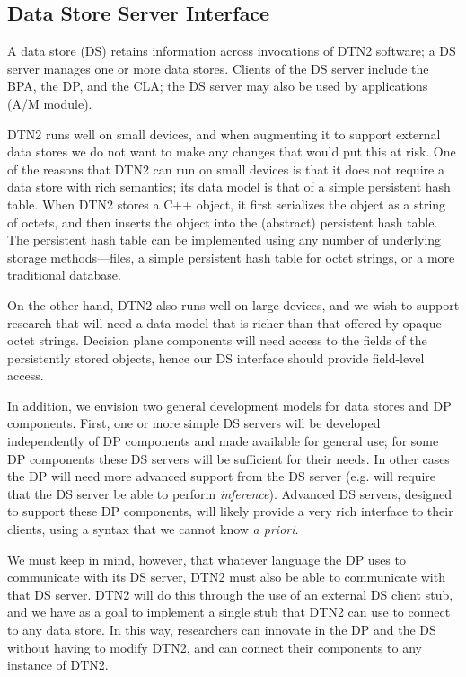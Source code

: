 \subsection{Data Store Server Interface}

A data store (DS) retains information across invocations of DTN2
software; a DS server manages one or more data stores. Clients of the
DS server include the BPA, the DP, and the CLA; the DS server may also
be used by applications (A/M module).

DTN2 runs well on small devices, and when augmenting it to support
external data stores we do not want to make any changes that would put
this at risk. One of the reasons that DTN2 can run on small devices is
that it does not require a data store with rich semantics; its data
model is that of a simple persistent hash table.  When DTN2 stores a
C++ object, it first serializes the object as a string of octets, and
then inserts the object into the (abstract) persistent hash table. The
persistent hash table can be implemented using any number of
underlying storage methods---files, a simple persistent hash table for
octet strings, or a more traditional database.

On the other hand, DTN2 also runs well on large devices, and we wish
to support research that will need a data model that is richer than
that offered by opaque octet strings. Decision plane components will
need access to the fields of the persistently stored objects, hence
our DS interface should provide field-level access.

In addition, we envision two general development models for data
stores and DP components. First, one or more simple DS servers will be
developed independently of DP components and made available for
general use; for some DP components these DS servers will be
sufficient for their needs. In other cases the DP will need more
advanced support from the DS server (e.g. will require that the DS
server be able to perform {\it inference}). Advanced DS servers,
designed to support these DP components, will likely provide a very
rich interface to their clients, using a syntax that we cannot know
{\em a priori}.

We must keep in mind, however, that whatever language the DP uses to
communicate with its DS server, DTN2 must also be able to communicate
with that DS server. DTN2 will do this through the use of an external
DS client stub, and we have as a goal to implement a single stub that
DTN2 can use to connect to any data store. In this way, researchers
can innovate in the DP and the DS without having to modify DTN2, and
can connect their components to any instance of DTN2.

